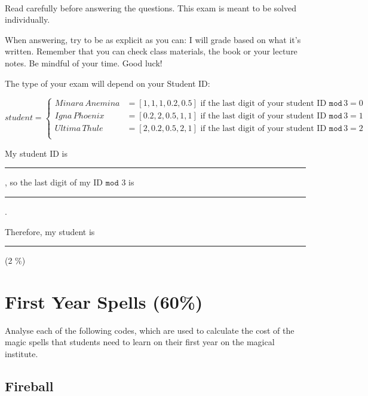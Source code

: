 \documentclass[11pt, onside]{article}
\title{
    \myclass \\
    \textbf{\mytitle} \\
    \myheader
    \date{}
}
\newcommand{\shortresponserule}{{\large\rule{5 cm}{0.3mm}}}
\begin{document}
\maketitle

\vspace{-1.5cm}

Read carefully before answering the questions.
This exam is meant to be solved individually.

When answering, try to be as explicit as you can: I will grade based on what it's written.
Remember that you can check class materials, the book or your lecture notes.
Be mindful of your time.
Good luck!

\vspace{1.5ex}

The type of your exam will depend on your Student ID:

$$ student = 
\begin{cases}
   Minara \, Anemina & = [1, 1, 1, 0.2, 0.5] \text{ if the last digit of your student ID } \mathtt{mod} \, 3 = 0 \\
   Igna \, Phoenix & = [0.2, 2, 0.5, 1, 1] \text{ if the last digit of your student ID } \mathtt{mod} \, 3 = 1 \\
   Ultima \, Thule & = [2, 0.2, 0.5, 2, 1] \text{ if the last digit of your student ID } \mathtt{mod} \, 3 = 2 \\
\end{cases}
$$

\vspace{1.5ex}

My student ID is \shortresponserule,
so the last digit of my ID $\mathtt{mod}$ 3 is \rule{1cm}{0.4mm}.

Therefore, my student is \shortresponserule \quad (2 \%)

\vspace{1.5ex}

\section{First Year Spells (60\%)}

Analyse each of the following codes, which are used to calculate the cost of the magic spells that students need to learn on their first year on the magical institute.

\subsection{Fireball}
\end{document}
